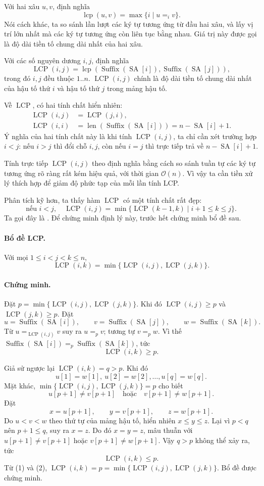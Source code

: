 \documentclass[11pt]{article}
\newcommand{\Oh}{\mathcal{O}}
\newcommand{\SA}{\operatorname{SA}}
\newcommand{\Suf}{\operatorname{Suffix}}
\newcommand{\Len}{\operatorname{len}}
\newcommand{\LCP}{\operatorname{LCP}}
\newcommand{\lcp}{\operatorname{lcp}}
\begin{document}
Với hai xâu \(u,v\), định nghĩa
\[
  \lcp(u,v)=\max\{i\mid u=_i v\}.
\]
Nói cách khác, ta so sánh lần lượt các ký tự tương ứng từ đầu hai xâu, và lấy
vị trí lớn nhất mà các ký tự tương ứng còn liên tục bằng nhau. Giá trị này
được gọi là độ dài tiền tố chung dài nhất của hai xâu.

Với các số nguyên dương \(i,j\), định nghĩa
\[
  \LCP(i,j)=\lcp(\Suf(\SA[i]),\Suf(\SA[j])),
\]
trong đó \(i,j\) đều thuộc \(1..n\). \(\LCP(i,j)\) chính là độ dài tiền tố
chung dài nhất của hậu tố thứ \(i\) và hậu tố thứ \(j\) trong mảng hậu tố.

Về \(\LCP\), có hai tính chất hiển nhiên:
\[
\begin{aligned}
  \LCP(i,j)&=\LCP(j,i),\\
  \LCP(i,i)&=\Len(\Suf(\SA[i]))=n-\SA[i]+1.
\end{aligned}
\]
Ý nghĩa của hai tính chất này là khi tính \(\LCP(i,j)\), ta chỉ cần xét
trường hợp \(i<j\): nếu \(i>j\) thì đổi chỗ \(i,j\), còn nếu \(i=j\) thì trực
tiếp trả về \(n-\SA[i]+1\).

Tính trực tiếp \(\LCP(i,j)\) theo định nghĩa bằng cách so sánh tuần tự các ký
tự tương ứng rõ ràng rất kém hiệu quả, với thời gian \(\Oh(n)\). Vì vậy ta
cần tiền xử lý thích hợp để giảm độ phức tạp của mỗi lần tính LCP.

Phân tích kỹ hơn, ta thấy hàm \(\LCP\) có một tính chất rất đẹp:
\[
  \text{nếu }i<j,\quad
  \LCP(i,j)=\min\{\LCP(k-1,k)\mid i+1\le k\le j\}.
\]
Ta gọi đây là . Để chứng minh định lý này, trước hết chứng
minh bổ đề sau.

\paragraph{Bổ đề LCP.}
Với mọi \(1\le i<j<k\le n\),
\[
  \LCP(i,k)=\min\{\LCP(i,j),\LCP(j,k)\}.
\]

\paragraph{Chứng minh.}
Đặt \(p=\min\{\LCP(i,j),\LCP(j,k)\}\). Khi đó
\(\LCP(i,j)\ge p\) và \(\LCP(j,k)\ge p\). Đặt
\[
  u=\Suf(\SA[i]),\qquad v=\Suf(\SA[j]),\qquad w=\Suf(\SA[k]).
\]
Từ \(u=_{\LCP(i,j)}v\) suy ra \(u=_p v\); tương tự \(v=_p w\). Vì thế
\(\Suf(\SA[i])=_p\Suf(\SA[k])\), tức
\[
  \LCP(i,k)\ge p. \tag{1}
\]

Giả sử ngược lại \(\LCP(i,k)=q>p\). Khi đó
\[
  u[1]=w[1],\ u[2]=w[2],\ldots,u[q]=w[q].
\]
Mặt khác, \(\min\{\LCP(i,j),\LCP(j,k)\}=p\) cho biết
\[
  u[p+1]\ne v[p+1]\quad\text{hoặc}\quad v[p+1]\ne w[p+1].
\]
Đặt
\[
  x=u[p+1],\qquad y=v[p+1],\qquad z=w[p+1].
\]
Do \(u<v<w\) theo thứ tự của mảng hậu tố, hiển nhiên \(x\le y\le z\). Lại vì
\(p<q\) nên \(p+1\le q\), suy ra \(x=z\). Do đó \(x=y=z\), mâu thuẫn với
\(u[p+1]\ne v[p+1]\) hoặc \(v[p+1]\ne w[p+1]\). Vậy \(q>p\) không thể xảy ra,
tức
\[
  \LCP(i,k)\le p. \tag{2}
\]
Từ (1) và (2), \(\LCP(i,k)=p=\min\{\LCP(i,j),\LCP(j,k)\}\). Bổ đề được chứng
minh.
\end{document}
